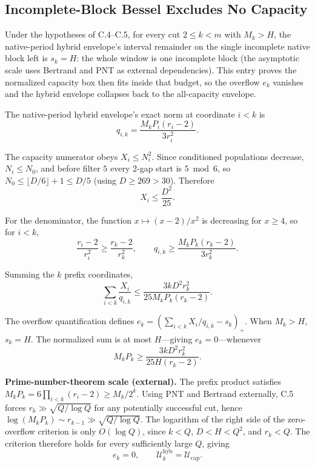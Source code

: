 \subsection{Incomplete-Block Bessel Excludes No Capacity}
\label{sec:appendix-c-6}

Under the hypotheses of C.4--C.5, for every cut $2\le k<m$ with $M_k>H$, the
native-period hybrid envelope's interval remainder on the single incomplete
native block left is $s_k=H$: the whole window is one incomplete block (the
asymptotic scale uses Bertrand and PNT as external dependencies). This entry
proves the
normalized capacity box then fits inside that budget, so the overflow $e_k$
vanishes and the hybrid envelope collapses back to the all-capacity
envelope.

The native-period hybrid envelope's exact norm at coordinate $i<k$ is
\begin{equation*}
q_{i,k}=\frac{M_kP_i(r_i-2)}{3r_i^2}.
\end{equation*}

The capacity numerator obeys $X_i\le N_i^2$. Since conditioned populations
decrease, $N_i\le N_0$, and before filter $5$ every 2-gap start is $5\bmod6$,
so $N_0\le\lfloor D/6\rfloor+1\le D/5$ (using $D\ge269>30$). Therefore
\begin{equation*}
X_i\le\frac{D^2}{25}.
\end{equation*}

For the denominator, the function $x\mapsto(x-2)/x^2$ is decreasing for
$x\ge4$, so for $i<k$,
\begin{equation*}
\frac{r_i-2}{r_i^2}\ge\frac{r_k-2}{r_k^2},
\qquad
q_{i,k}\ge\frac{M_kP_k(r_k-2)}{3r_k^2}.
\end{equation*}

Summing the $k$ prefix coordinates,
\begin{equation*}
\sum_{i<k}\frac{X_i}{q_{i,k}}
\le\frac{3kD^2r_k^2}{25M_kP_k(r_k-2)}.
\end{equation*}

The overflow quantification defines
$e_k=(\sum_{i<k}X_i/q_{i,k}-s_k)_+$. When $M_k>H$, $s_k=H$. The normalized
sum is at most $H$---giving $e_k=0$---whenever
\begin{equation*}
M_kP_k\ge\frac{3kD^2r_k^2}{25H(r_k-2)}.
\end{equation*}

\textbf{Prime-number-theorem scale (external).} The prefix product satisfies
$M_kP_k=6\prod_{i<k}(r_i-2)\ge M_k/2^k$. Using PNT and Bertrand externally,
C.5 forces $r_k\gg\sqrt{Q/\log Q}$ for any potentially successful cut, hence
$\log(M_kP_k)\sim r_{k-1}\gg\sqrt{Q/\log Q}$. The logarithm of the right side
of the zero-overflow criterion is only $O(\log Q)$, since $k<Q$,
$D\lt H\lt Q^2$, and $r_k<Q$. The criterion therefore holds for every sufficiently
large $Q$, giving
\begin{equation*}
e_k=0,\qquad\mathcal U_k^{\mathrm{hyb}}=\mathcal U_{\mathrm{cap}}.
\end{equation*}

